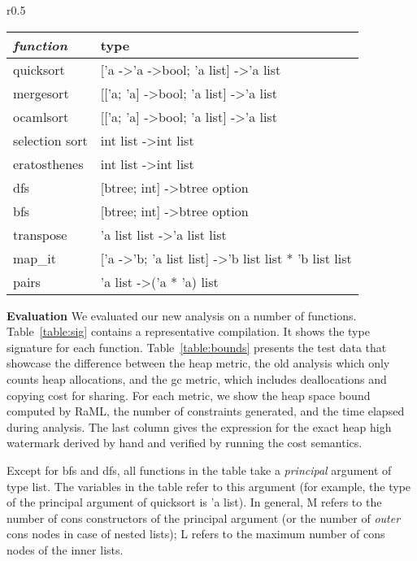 \documentclass{easychair}
\theoremstyle{definition}
\begin{document}
\label{sect:evaluation}
\begin{wraptable}{r}{0.5\textwidth}
\small
	\vspace{-20pt}
		\begin{center}
	\begin{tabular}{ll}
		\hline
		\textit{\textbf{function}} & type \\ \hline
		quicksort & {[}'a -\textgreater 'a -\textgreater bool; 'a list{]} -\textgreater 'a list \\
		mergesort & {[}{[}'a; 'a{]} -\textgreater bool; 'a list{]} -\textgreater 'a list \\
		ocamlsort & {[}{[}'a; 'a{]} -\textgreater bool; 'a list{]} -\textgreater 'a list \\
		selection sort & int list -\textgreater int list \\
		eratosthenes & int list -\textgreater int list \\
		dfs & {[}btree; int{]} -\textgreater btree option \\
		bfs & {[}btree; int{]} -\textgreater btree option \\
		transpose & 'a list list -\textgreater 'a list list \\
		map\_it & {[}'a -\textgreater 'b; 'a list list{]} -\textgreater 'b list list * 'b list list\\
		pairs & 'a list -\textgreater ('a * 'a) list \\ \hline
	\end{tabular}
			\end{center}
				\vspace{-10pt}
			\caption{Signature of Test Functions}
		\vspace{-10pt}
\label{table:sig}
\end{wraptable}

\textbf{Evaluation}
We evaluated our new analysis on a number of functions. Table~\ref{table:sig} contains a representative compilation.
It shows the type signature for each function. Table~\ref{table:bounds} presents the test 
data that
showcase the difference between the heap metric, the old analysis which only counts 
heap allocations, and the gc metric, which includes deallocations and copying cost for sharing.
For each metric, we show the heap space bound computed by RaML, 
the number of constraints generated, and the time elapsed during analysis. The last column gives
the expression for the exact heap high watermark derived by hand and verified by running the 
cost semantics.

Except for bfs and dfs, all functions in the table take a \emph{principal} argument of type list. 
The variables in the table refer to this argument (for example, the type of the 
principal argument of 
quicksort is 'a list). In general, M refers to the number of cons constructors of the principal 
argument (or the number of \emph{outer} cons nodes in case of nested lists); L refers to the
maximum number of cons nodes of the inner lists.
\end{document}

